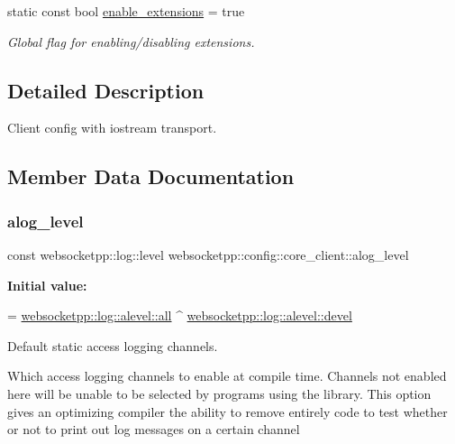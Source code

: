 \begin{DoxyCompactItemize}
\mbox{\label{structwebsocketpp_1_1config_1_1core__client_a21b1a53d292be873c1fffa7222cb3804}} 
static const bool \mbox{\hyperlink{structwebsocketpp_1_1config_1_1core__client_a21b1a53d292be873c1fffa7222cb3804}{enable\+\_\+extensions}} = true
\begin{DoxyCompactList}\small\item\em Global flag for enabling/disabling extensions. \end{DoxyCompactList}\end{DoxyCompactItemize}


\subsection{Detailed Description}
Client config with iostream transport. 

\subsection{Member Data Documentation}
\mbox{\label{structwebsocketpp_1_1config_1_1core__client_a286f74bd1d4f4a7c363866ef92284992}} 
\subsubsection{\texorpdfstring{alog\+\_\+level}{alog\_level}}
{\footnotesize\ttfamily const websocketpp\+::log\+::level websocketpp\+::config\+::core\+\_\+client\+::alog\+\_\+level\hspace{0.3cm}{\ttfamily [static]}}

{\bfseries Initial value\+:}
\begin{DoxyCode}
=
        \mbox{\hyperlink{structwebsocketpp_1_1log_1_1alevel_a853aa0b8976e53f3181af3bc398d493e}{websocketpp::log::alevel::all}} ^ 
      \mbox{\hyperlink{structwebsocketpp_1_1log_1_1alevel_a65ec21c75999c993c25c72569018f576}{websocketpp::log::alevel::devel}}
\end{DoxyCode}


Default static access logging channels. 

Which access logging channels to enable at compile time. Channels not enabled here will be unable to be selected by programs using the library. This option gives an optimizing compiler the ability to remove entirely code to test whether or not to print out log messages on a certain channel

